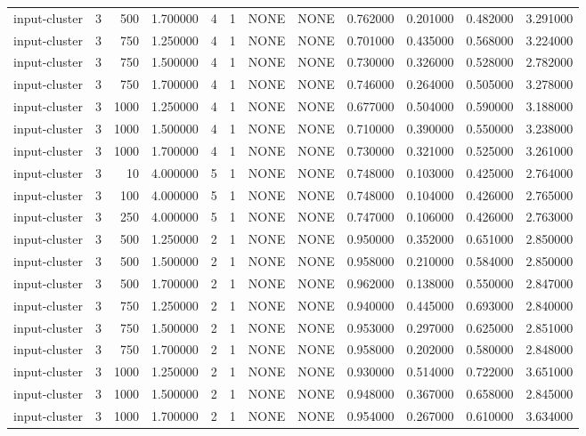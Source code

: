 \begin{tabular}{lrrrllllrrrr}
input-cluster & 3 & 500 & 1.700000 & 4 & 1 & NONE & NONE & 0.762000 & 0.201000 & 0.482000 & 3.291000 \\
input-cluster & 3 & 750 & 1.250000 & 4 & 1 & NONE & NONE & 0.701000 & 0.435000 & 0.568000 & 3.224000 \\
input-cluster & 3 & 750 & 1.500000 & 4 & 1 & NONE & NONE & 0.730000 & 0.326000 & 0.528000 & 2.782000 \\
input-cluster & 3 & 750 & 1.700000 & 4 & 1 & NONE & NONE & 0.746000 & 0.264000 & 0.505000 & 3.278000 \\
input-cluster & 3 & 1000 & 1.250000 & 4 & 1 & NONE & NONE & 0.677000 & 0.504000 & 0.590000 & 3.188000 \\
input-cluster & 3 & 1000 & 1.500000 & 4 & 1 & NONE & NONE & 0.710000 & 0.390000 & 0.550000 & 3.238000 \\
input-cluster & 3 & 1000 & 1.700000 & 4 & 1 & NONE & NONE & 0.730000 & 0.321000 & 0.525000 & 3.261000 \\
input-cluster & 3 & 10 & 4.000000 & 5 & 1 & NONE & NONE & 0.748000 & 0.103000 & 0.425000 & 2.764000 \\
input-cluster & 3 & 100 & 4.000000 & 5 & 1 & NONE & NONE & 0.748000 & 0.104000 & 0.426000 & 2.765000 \\
input-cluster & 3 & 250 & 4.000000 & 5 & 1 & NONE & NONE & 0.747000 & 0.106000 & 0.426000 & 2.763000 \\
input-cluster & 3 & 500 & 1.250000 & 2 & 1 & NONE & NONE & 0.950000 & 0.352000 & 0.651000 & 2.850000 \\
input-cluster & 3 & 500 & 1.500000 & 2 & 1 & NONE & NONE & 0.958000 & 0.210000 & 0.584000 & 2.850000 \\
input-cluster & 3 & 500 & 1.700000 & 2 & 1 & NONE & NONE & 0.962000 & 0.138000 & 0.550000 & 2.847000 \\
input-cluster & 3 & 750 & 1.250000 & 2 & 1 & NONE & NONE & 0.940000 & 0.445000 & 0.693000 & 2.840000 \\
input-cluster & 3 & 750 & 1.500000 & 2 & 1 & NONE & NONE & 0.953000 & 0.297000 & 0.625000 & 2.851000 \\
input-cluster & 3 & 750 & 1.700000 & 2 & 1 & NONE & NONE & 0.958000 & 0.202000 & 0.580000 & 2.848000 \\
input-cluster & 3 & 1000 & 1.250000 & 2 & 1 & NONE & NONE & 0.930000 & 0.514000 & 0.722000 & 3.651000 \\
input-cluster & 3 & 1000 & 1.500000 & 2 & 1 & NONE & NONE & 0.948000 & 0.367000 & 0.658000 & 2.845000 \\
input-cluster & 3 & 1000 & 1.700000 & 2 & 1 & NONE & NONE & 0.954000 & 0.267000 & 0.610000 & 3.634000 \\

\end{tabular}
